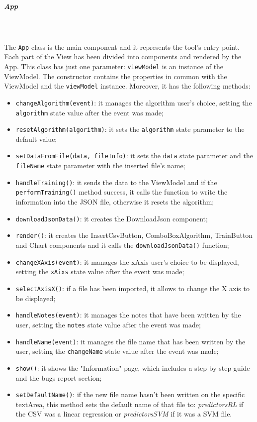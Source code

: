 \subparagraph*{App}\mbox{} \\ \mbox{} \\
The \texttt{App} class is the main component and it represents the tool's entry point. Each part of the View has been divided into components and rendered by the App. This class has just one parameter: \texttt{viewModel} is an instance of the ViewModel. The constructor contains the properties in common with the ViewModel and the \texttt{viewModel} instance. Moreover, it has the following methods:
\begin{itemize}
\item \texttt{changeAlgorithm(event)}: it manages the algorithm user's choice, setting the \\ \texttt{algorithm} state value after the event was made;
\item \texttt{resetAlgorithm(algorithm)}: it sets the \texttt{algorithm} state parameter to the default value;
\item \texttt{setDataFromFile(data, fileInfo)}: it sets the \texttt{data} state parameter and the \\ \texttt{fileName} state parameter with the inserted file's name;
\item \texttt{handleTraining()}: it sends the data to the ViewModel and if the \texttt{performTraining()} method success, it calls the function to write the information into the JSON file, otherwise it resets the algorithm;
\item \texttt{downloadJsonData()}: it creates the DownloadJson component;
\item \texttt{render()}: it creates the InsertCsvButton, ComboBoxAlgorithm, TrainButton and Chart components and it calls the \texttt{downloadJsonData()} function;
\item \texttt{changeXAxis(event)}: it manages the xAxis user's choice to be displayed, setting the \texttt{xAixs} state value after the event was made;
\item \texttt{selectAxisX()}: if a file has been imported, it allows to change the X axis to be displayed;
\item \texttt{handleNotes(event)}: it manages the notes that have been written by the user, setting the \texttt{notes} state value after the event was made;
\item \texttt{handleName(event)}: it manages the file name that has been written by the user, setting the \texttt{changeName} state value after the event was made;
\item \texttt{show()}: it shows the "Information" page, which includes a step-by-step guide and the bugs report section;
\item \texttt{setDefaultName()}: if the new file name hasn't been written on the specific textArea, this method sets the default name of that file to: \textit{predictorsRL} if the CSV was a linear regression or \textit{predictorsSVM} if it was a SVM file.
\end{itemize}	


